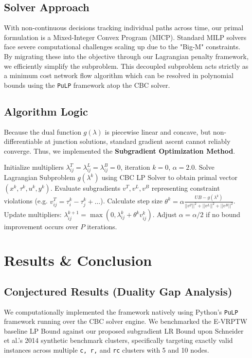 \documentclass[11pt]{article}
\begin{document}
\subsection{Solver Approach}
With non-continuous decisions tracking individual paths across time, our primal formulation is a Mixed-Integer Convex Program (MICP). Standard MILP solvers face severe computational challenges scaling up due to the "Big-M" constraints. By migrating these into the objective through our Lagrangian penalty framework, we efficiently simplify the subproblem. This decoupled subproblem acts strictly as a minimum cost network flow algorithm which can be resolved in polynomial bounds using the \texttt{PuLP} framework atop the CBC solver.

\subsection{Algorithm Logic}
Because the dual function $g(\lambda)$ is piecewise linear and concave, but non-differentiable at junction solutions, standard gradient ascent cannot reliably converge. Thus, we implemented the \textbf{Subgradient Optimization Method}.
\begin{algorithm}[H]
\caption{Subgradient Optimization iteratively solving $g(\lambda)$}
\begin{algorithmic}[1]
\STATE Initialize multipliers $\lambda^T_{ij} = \lambda^L_{ij} = \lambda^B_{ij} = 0$, iteration $k=0$, $\alpha = 2.0$.
    \STATE Solve Lagrangian Subproblem $g(\lambda^k)$ using CBC LP Solver to obtain primal vector $(x^k, \tau^k, u^k, y^k)$.
    \STATE Evaluate subgradients $v^T, v^L, v^B$ representing constraint violations (e.g. $v^T_{ij} = \tau_i^k - \tau_j^k + \dots$).
    \STATE Calculate step size $\theta^k = \alpha \frac{UB - g(\lambda^k)}{||v^T||^2 + ||v^L||^2 + ||v^B||^2}$.
    \STATE Update multipliers: $\lambda_{ij}^{k+1} = \max(0, \lambda_{ij}^k + \theta^k v_{ij}^k)$.
    \STATE Adjust $\alpha = \alpha / 2$ if no bound improvement occurs over $P$ iterations.
\ENDWHILE
\end{algorithmic}
\end{algorithm}

\section{Results \& Conclusion}
\subsection{Conjectured Results (Duality Gap Analysis)}
We computationally implemented the framework natively using Python's \texttt{PuLP} framework running over the CBC solver engine. We benchmarked the E-VRPTW baseline LP Bound against our proposed subgradient LR Bound upon Schneider et al.'s 2014 synthetic benchmark clusters, specifically targeting exactly valid instances across multiple \texttt{c, r,} and \texttt{rc} clusters with 5 and 10 nodes.
\end{document}
